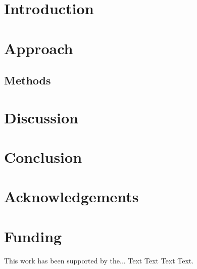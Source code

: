\documentclass{bioinfo}
\begin{document}
\section{Introduction}


\section{Approach}



\begin{methods}
\section{Methods}

\end{methods}


\section{Discussion}







%
%






\section{Conclusion}


\section*{Acknowledgements}


\section*{Funding}

This work has been supported by the... Text Text  Text Text.\vspace*{-12pt}

%
%
%
%
%
%
%
%




\end{document}
